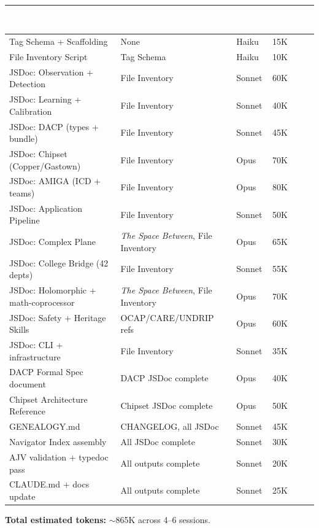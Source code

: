 \documentclass[11pt,letterpaper]{article}
\newcommand{\tableheader}[1]{\textbf{\sffamily\textcolor{white}{#1}}}
\begin{document}
\begin{center}
\begin{tabularx}{\textwidth}{L{3.5cm}L{3cm}C{1.5cm}C{2cm}}
\toprule
{}
\tableheader{Component} & \tableheader{Dependencies} & \tableheader{Model} & \tableheader{Est. Tokens} \\
\midrule
Tag Schema + Scaffolding & None & Haiku & 15K \\
File Inventory Script & Tag Schema & Haiku & 10K \\
JSDoc: Observation + Detection & File Inventory & Sonnet & 60K \\
JSDoc: Learning + Calibration & File Inventory & Sonnet & 40K \\
JSDoc: DACP (types + bundle) & File Inventory & Sonnet & 45K \\
JSDoc: Chipset (Copper/Gastown) & File Inventory & Opus & 70K \\
JSDoc: AMIGA (ICD + teams) & File Inventory & Opus & 80K \\
JSDoc: Application Pipeline & File Inventory & Sonnet & 50K \\
JSDoc: Complex Plane & \textit{The Space Between}, File Inventory & Opus & 65K \\
JSDoc: College Bridge (42 depts) & File Inventory & Sonnet & 55K \\
JSDoc: Holomorphic + math-coprocessor & \textit{The Space Between}, File Inventory & Opus & 70K \\
JSDoc: Safety + Heritage Skills & OCAP/CARE/UNDRIP refs & Opus & 60K \\
JSDoc: CLI + infrastructure & File Inventory & Sonnet & 35K \\
DACP Formal Spec document & DACP JSDoc complete & Opus & 40K \\
Chipset Architecture Reference & Chipset JSDoc complete & Opus & 50K \\
GENEALOGY.md & CHANGELOG, all JSDoc & Sonnet & 45K \\
Navigator Index assembly & All JSDoc complete & Sonnet & 30K \\
AJV validation + typedoc pass & All outputs complete & Sonnet & 20K \\
CLAUDE.md + docs update & All outputs complete & Sonnet & 25K \\
\bottomrule
\end{tabularx}
\end{center}

\textbf{Total estimated tokens:} $\sim$865K across 4--6 sessions.
\end{document}

